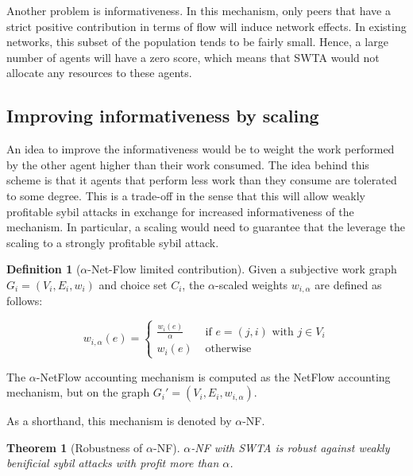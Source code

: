 \documentclass[a4paper,11pt]{book}
\newtheorem{theorem}{Theorem}
\theoremstyle{definition}
\newtheorem{definition}{Definition}
\begin{document}
Another problem is informativeness. In this mechanism,
only peers that have a strict positive contribution in terms of flow will induce network effects.
In existing networks, this subset of the population tends to be fairly small. Hence, a large
number of agents will have a zero score, which means that SWTA would not allocate any resources
to these agents.

\subsection{Improving informativeness by scaling}
An idea to improve the informativeness would be to weight the work performed by the other
agent higher than their work consumed. The idea behind this scheme is that it agents
that perform less work than they consume are tolerated to some degree. This is a trade-off
in the sense that this will allow weakly profitable sybil attacks in exchange for increased
informativeness of the mechanism. In particular, a scaling would need to guarantee
that the leverage the scaling to a strongly profitable sybil attack. 

\begin{definition}[$\alpha$-Net-Flow limited contribution]
    Given a subjective work graph $G_i = (V_i, E_i, w_i)$ and choice set $C_i$, the $\alpha$-scaled
    weights $w_{i,\alpha}$ are defined as follows:

    \begin{equation*}
        w_{i,\alpha}(e) = 
        \begin{cases}
            \frac{w_i(e)}{\alpha} &\mbox{ if } e = (j, i) \mbox{ with } j \in V_i \\
            w_i(e) &\mbox{ otherwise}
        \end{cases}
    \end{equation*}
    
    The $\alpha$-NetFlow accounting mechanism is computed as the NetFlow accounting
    mechanism, but on the graph $G_i' = (V_i, E_i, w_{i,\alpha})$.

    As a shorthand, this mechanism is denoted by $\alpha$-NF.
\end{definition}

\begin{theorem}[Robustness of $\alpha$-NF]
    $\alpha$-NF with SWTA is robust against weakly benificial sybil attacks with
    profit more than $\alpha$.
    \label{thm:sybil-anf}
\end{theorem}
\end{document}
